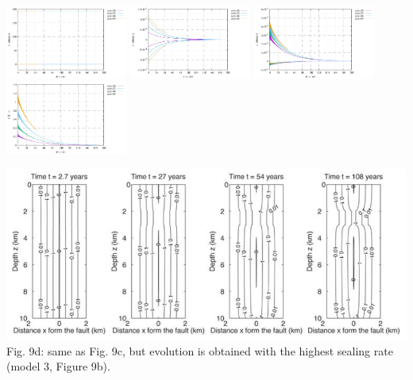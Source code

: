 \begin{center}
\includegraphics[width=4cm]{python_codes/fieldstone_126/results/model3/stats_p.pdf}
\includegraphics[width=4cm]{python_codes/fieldstone_126/results/model3/stats_u.pdf}
\includegraphics[width=4cm]{python_codes/fieldstone_126/results/model3/stats_v.pdf}
\includegraphics[width=4cm]{python_codes/fieldstone_126/results/model3/cfl.pdf}\\
\end{center}


\newpage


\begin{center}
\includegraphics[width=14cm]{python_codes/fieldstone_126/images/grfr03d}\\
{\captionfont Fig. 9d: same as Fig. 9c, but evolution is 
obtained with the highest sealing rate (model 3, Figure 9b).}
\end{center}

